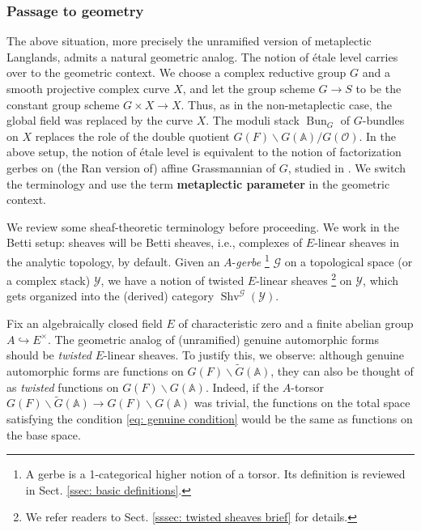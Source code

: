 \documentclass[10pt]{amsart}
\newcommand{\sssec}{\subsubsection}
\theoremstyle{remark}
\newcommand{\wt}{\widetilde}
\newcommand{\on}{\operatorname}
\newcommand{\cG}{\mathcal{G}}
\newcommand{\cO}{\mathcal{O}}
\newcommand{\cY}{\mathcal{Y}}
\newcommand{\Shv}{\on{Shv}}
\newcommand{\Bun}{\on{Bun}}
\begin{document}
\sssec{Passage to geometry}
The above situation, more precisely the unramified version of metaplectic Langlands, admits a natural geometric analog. The notion of \'etale level carries over to the geometric context. We choose a complex reductive group $G$ and a smooth projective complex curve $X$, and let the group scheme $G\rightarrow S$ to be the constant group scheme $G\times X\rightarrow X$. Thus, as in the non-metaplectic case, the global field was replaced by the curve $X$. The moduli stack $\Bun_G$ of $G$-bundles on $X$ replaces the role of the double quotient $G(F)\backslash G(\mathbb{A})/G(\cO)$. In the above setup, the notion of \'etale level is equivalent to the notion of factorization gerbes on (the Ran version of) affine Grassmannian of $G$, studied in \cite{Rei, GL}. We switch the terminology and use the term \textbf{metaplectic parameter} in the geometric context. 
\medskip

We review some sheaf-theoretic terminology before proceeding. We work in the Betti setup: sheaves will be Betti sheaves, i.e., complexes of $E$-linear sheaves in the analytic topology, by default.
Given an $A$-\emph{gerbe} \footnote{A gerbe is a 1-categorical higher notion of a torsor. Its definition is reviewed in Sect. \ref{ssec: basic definitions}.} $\cG$ on a topological space (or a complex stack) $\cY$, we have a notion of twisted $E$-linear sheaves \footnote{We refer readers to Sect. \ref{sssec: twisted sheaves brief} for details.} on $\cY$, which gets organized into the (derived) category $\Shv^{\cG}(\cY)$. 
\medskip

Fix an algebraically closed field $E$ of characteristic zero and a finite abelian group $A\hookrightarrow E^{\times}$. The geometric analog of (unramified) genuine automorphic forms should be \emph{twisted} $E$-linear sheaves. To justify this, we observe: although genuine automorphic forms are functions on $G(F)\backslash \wt{G}(\mathbb{A})$, they can also be thought of as \emph{twisted} functions on $G(F)\backslash G(\mathbb{A})$. Indeed, if the $A$-torsor $G(F)\backslash \wt{G}(\mathbb{A})\rightarrow G(F)\backslash G(\mathbb{A})$ was trivial, the functions on the total space satisfying the condition \eqref{eq: genuine condition} would be the same as functions on the base space.
\medskip
\end{document}
